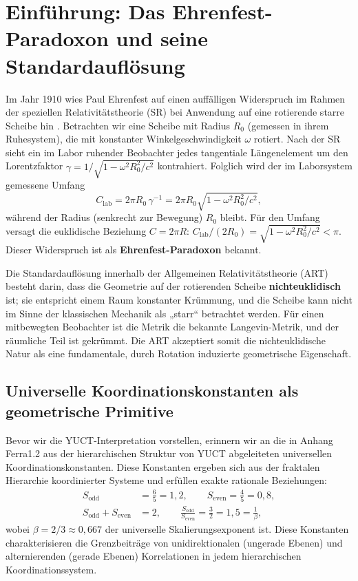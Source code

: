 \documentclass[12pt,a4paper]{article}
\newcommand{\betaf}{\beta}
\newcommand{\Sodd}{S_{\mathrm{odd}}}
\newcommand{\Seven}{S_{\mathrm{even}}}
\begin{document}
	\tableofcontents
	\newpage
	
	\section{Einführung: Das Ehrenfest-Paradoxon und seine Standardauflösung}
	\label{sec:intro}
	
	Im Jahr 1910 wies Paul Ehrenfest auf einen auffälligen Widerspruch im Rahmen der speziellen Relativitätstheorie (SR) bei Anwendung auf eine rotierende starre Scheibe hin \cite{Ehrenfest1909}. Betrachten wir eine Scheibe mit Radius \(R_0\) (gemessen in ihrem Ruhesystem), die mit konstanter Winkelgeschwindigkeit \(\omega\) rotiert. Nach der SR sieht ein im Labor ruhender Beobachter jedes tangentiale Längenelement um den Lorentzfaktor \(\gamma = 1/\sqrt{1 - \omega^2 R_0^2/c^2}\) kontrahiert. Folglich wird der im Laborsystem gemessene Umfang
	\[
	C_{\text{lab}} = 2\pi R_0 \, \gamma^{-1} = 2\pi R_0 \sqrt{1 - \omega^2 R_0^2/c^2},
	\]
	während der Radius (senkrecht zur Bewegung) \(R_0\) bleibt. Für den Umfang versagt die euklidische Beziehung \(C = 2\pi R\): \(C_{\text{lab}}/(2R_0) = \sqrt{1 - \omega^2 R_0^2/c^2} < \pi\). Dieser Widerspruch ist als \textbf{Ehrenfest-Paradoxon} bekannt.
	
	Die Standardauflösung innerhalb der Allgemeinen Relativitätstheorie (ART) besteht darin, dass die Geometrie auf der rotierenden Scheibe \textbf{nichteuklidisch} ist; sie entspricht einem Raum konstanter Krümmung, und die Scheibe kann nicht im Sinne der klassischen Mechanik als „starr“ betrachtet werden. Für einen mitbewegten Beobachter ist die Metrik die bekannte Langevin-Metrik, und der räumliche Teil ist gekrümmt. Die ART akzeptiert somit die nichteuklidische Natur als eine fundamentale, durch Rotation induzierte geometrische Eigenschaft.
	
	\subsection{Universelle Koordinationskonstanten als geometrische Primitive}
	
	Bevor wir die YUCT-Interpretation vorstellen, erinnern wir an die in Anhang Ferra1.2 aus der hierarchischen Struktur von YUCT abgeleiteten universellen Koordinationskonstanten. Diese Konstanten ergeben sich aus der fraktalen Hierarchie koordinierter Systeme und erfüllen exakte rationale Beziehungen:
	\begin{align}
		\Sodd &= \frac{6}{5} = 1,2, \qquad \Seven = \frac{4}{5} = 0,8, \\
		\Sodd + \Seven &= 2, \qquad \frac{\Sodd}{\Seven} = \frac{3}{2} = 1,5 = \frac{1}{\betaf},
	\end{align}
	wobei \(\betaf = 2/3 \approx 0,667\) der universelle Skalierungsexponent ist. Diese Konstanten charakterisieren die Grenzbeiträge von unidirektionalen (ungerade Ebenen) und alternierenden (gerade Ebenen) Korrelationen in jedem hierarchischen Koordinationssystem.
	
\end{document}

